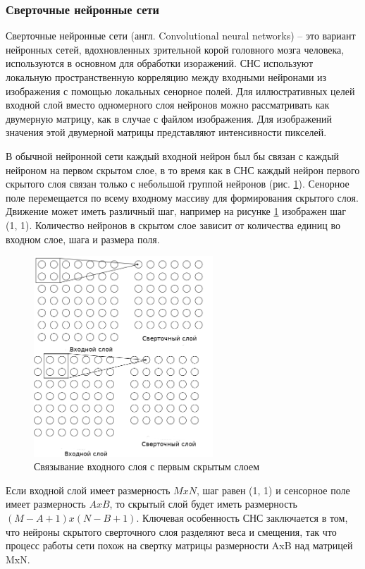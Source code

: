 \subsubsection{Сверточные нейронные сети}

Сверточные нейронные сети (англ. Convolutional neural networks) -- это вариант нейронных сетей, вдохновленных зрительной корой головного мозга человека\cite{Hubel}, используются в основном для обработки изоражений. СНС используют локальную пространственную корреляцию между входными нейронами из изображения с помощью локальных сенорное полей. Для иллюстративных целей входной слой вместо одномерного слоя нейронов можно рассматривать как двумерную матрицу, как в случае с файлом изображения. Для изображений значения этой двумерной матрицы представляют интенсивности пикселей. 

В обычной нейронной сети каждый входной нейрон был бы связан с каждый нейроном на первом скрытом слое, в то время как в СНС каждый нейрон первого скрытого слоя связан только с небольшой группой нейронов (рис. \ref{anal:CNN-first}). Сенорное поле перемещается по всему входному массиву для формирования скрытого слоя. Движение может иметь различный шаг, например на рисунке \ref{anal:CNN-first} изображен шаг (1, 1). Количество нейронов в скрытом слое зависит от количества единиц во входном слое, шага и размера поля.

\begin{figure}
	\centering
	\includegraphics[width=0.6\textwidth]{inc/img/cnn-first.png}
	\caption{Связывание входного слоя с первым скрытым слоем}
	\label{anal:CNN-first}
\end{figure}

Если входной слой имеет размерность $MxN$, шаг равен (1, 1) и сенсорное поле имеет размерность $AxB$, то скрытый слой будет иметь размерность $(M - A + 1)x(N - B + 1)$. Ключевая особенность СНС заключается в том, что нейроны скрытого сверточного слоя разделяют веса и смещения, так что процесс работы сети похож на свертку матрицы размерности AxB над матрицей MxN.

